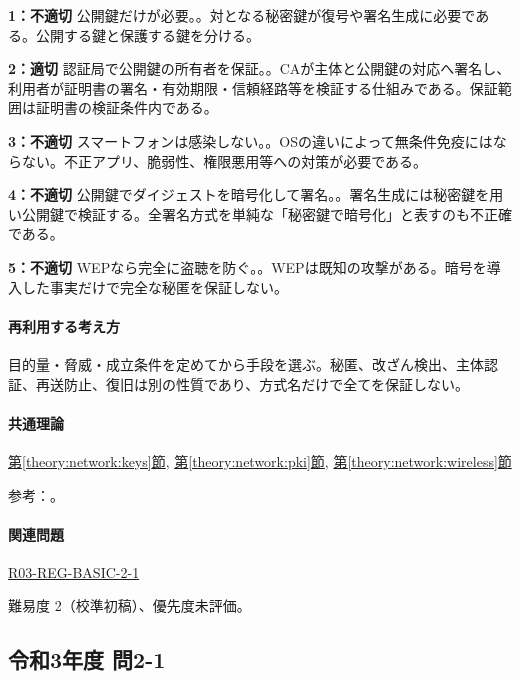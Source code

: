 \noindent\textbf{1：不適切} 公開鍵だけが必要。。対となる秘密鍵が復号や署名生成に必要である。公開する鍵と保護する鍵を分ける。\par

\noindent\textbf{2：適切} 認証局で公開鍵の所有者を保証。。CAが主体と公開鍵の対応へ署名し、利用者が証明書の署名・有効期限・信頼経路等を検証する仕組みである。保証範囲は証明書の検証条件内である。\par

\noindent\textbf{3：不適切} スマートフォンは感染しない。。OSの違いによって無条件免疫にはならない。不正アプリ、脆弱性、権限悪用等への対策が必要である。\par

\noindent\textbf{4：不適切} 公開鍵でダイジェストを暗号化して署名。。署名生成には秘密鍵を用い公開鍵で検証する。全署名方式を単純な「秘密鍵で暗号化」と表すのも不正確である。\par

\noindent\textbf{5：不適切} WEPなら完全に盗聴を防ぐ。。WEPは既知の攻撃がある。暗号を導入した事実だけで完全な秘匿を保証しない。\par

\paragraph{再利用する考え方} 目的量・脅威・成立条件を定めてから手段を選ぶ。秘匿、改ざん検出、主体認証、再送防止、復旧は別の性質であり、方式名だけで全てを保証しない。

\paragraph{共通理論} \hyperref[theory:network:keys]{第\ref*{theory:network:keys}節}, \hyperref[theory:network:pki]{第\ref*{theory:network:pki}節}, \hyperref[theory:network:wireless]{第\ref*{theory:network:wireless}節}

\par 参考：\cite{net_pki,net_signature,net_wep}。

\paragraph{関連問題} \hyperref[q:r03-reg-basic-2-1]{R03-REG-BASIC-2-1}

\par 難易度 2（校準初稿）、優先度未評価。

\subsection{令和3年度 問2-1}
\label{q:r03-reg-basic-2-1}

